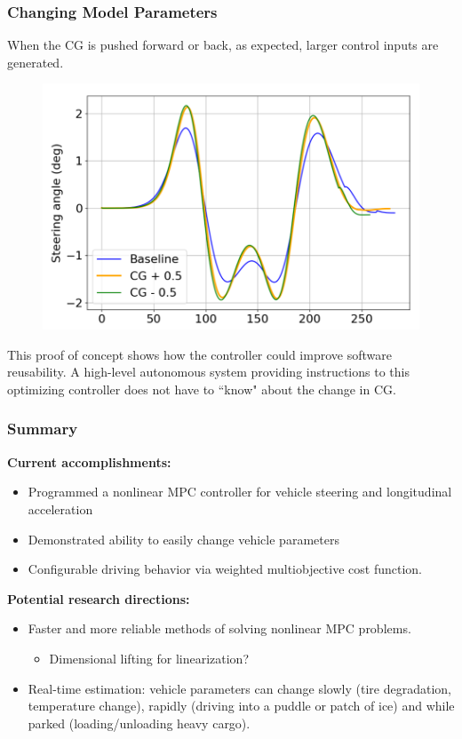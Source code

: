 \documentclass{beamer}
\begin{document}
\begin{frame}
\frametitle{Changing Model Parameters}

When the CG is pushed forward or back, as expected, larger control inputs are generated.

\vspace{-0.5em}
\begin{figure}
	\includegraphics[width=0.75\linewidth]{figures/steering_angle_cg.png}
\end{figure}
\vspace{-0.5em}

This proof of concept shows how the controller could improve software reusability. A high-level autonomous system providing instructions to this optimizing controller does not have to ``know" about the change in CG.
\end{frame}

\begin{frame}
\frametitle{Summary}
\textbf{Current accomplishments:}
\begin{itemize}
	\item Programmed a nonlinear MPC controller for vehicle steering and longitudinal acceleration
	\item Demonstrated ability to easily change vehicle parameters
	\item Configurable driving behavior via weighted multiobjective cost function.
\end{itemize}

\textbf{Potential research directions:}
\begin{itemize}
	\item Faster and more reliable methods of solving nonlinear MPC problems.
\begin{itemize}
	\item Dimensional lifting for linearization?
\end{itemize}
\item Real-time estimation: vehicle parameters can change slowly (tire degradation, temperature change), rapidly (driving into a puddle or patch of ice) and while parked (loading/unloading heavy cargo).
\end{itemize}

\end{frame}
\end{document}
